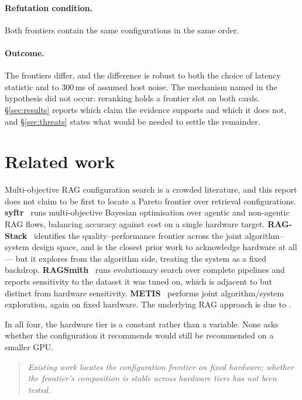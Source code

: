 \paragraph{Refutation condition.} Both frontiers contain the same
configurations in the same order.

\paragraph{Outcome.} The frontiers differ, and the difference is robust to both
the choice of latency statistic and to 300\,ms of assumed host noise. The
mechanism named in the hypothesis did not occur: reranking holds a frontier slot
on both cards. \S\ref{sec:results} reports which claim the evidence supports and
which it does not, and \S\ref{sec:threats} states what would be needed to settle
the remainder.

\section{Related work}

Multi-objective RAG configuration search is a crowded literature, and this
report does not claim to be first to locate a Pareto frontier over retrieval
configurations. \textbf{syftr}~\citep{conway2025syftr} runs multi-objective
Bayesian optimisation over agentic and non-agentic RAG flows, balancing accuracy
against cost on a single hardware target. \textbf{RAG-Stack}~\citep{jiang2025ragstack}
identifies the quality--performance frontier across the joint algorithm--system
design space, and is the closest prior work to acknowledge hardware at all --- but
it explores from the algorithm side, treating the system as a fixed backdrop.
\textbf{RAGSmith}~\citep{kartal2025ragsmith} runs evolutionary search over
complete pipelines and reports sensitivity to the dataset it was tuned on, which
is adjacent to but distinct from hardware sensitivity.
\textbf{METIS}~\citep{ray2025metis} performs joint algorithm/system exploration,
again on fixed hardware. The underlying RAG approach is due to
\citet{lewis2020rag}.

In all four, the hardware tier is a constant rather than a variable. None asks
whether the configuration it recommends would still be recommended on a smaller
GPU.

\begin{quote}\itshape
Existing work locates the configuration frontier on fixed hardware; whether the
frontier's composition is stable across hardware tiers has not been tested.
\end{quote}

